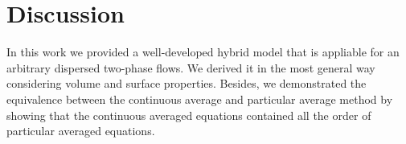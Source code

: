 \section{Discussion}

In this work we provided a well-developed hybrid model that is appliable for an arbitrary dispersed two-phase flows. 
We derived it in the most general way considering volume and surface properties. 
Besides, we demonstrated the equivalence between the continuous average and particular average method by showing that the continuous averaged equations contained all the order of particular averaged equations. 

